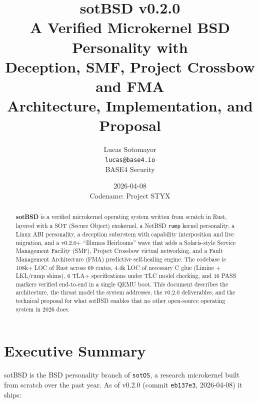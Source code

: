 \documentclass[11pt,a4paper]{article}
\title{
  \vspace{-1.5cm}
  \textbf{sotBSD v0.2.0} \\[0.4em]
  \large A Verified Microkernel BSD Personality with \\
  Deception, SMF, Project Crossbow and FMA \\[0.6em]
  \normalsize Architecture, Implementation, and Proposal
}
\author{
  Lucas Sotomayor \\
  \texttt{lucas@base4.io} \\
  BASE4 Security
}
\date{2026-04-08 \\ Codename: Project STYX}
\begin{document}

\maketitle
\thispagestyle{empty}

\begin{abstract}
\noindent
\textbf{sotBSD} is a verified microkernel operating system written from
scratch in Rust, layered with a SOT (Secure Object) exokernel, a NetBSD
\texttt{rump} kernel personality, a Linux ABI personality, a deception
subsystem with capability interposition and live migration, and a v0.2.0+
``Illumos Heirlooms'' wave that adds a Solaris-style Service Management
Facility (SMF), Project Crossbow virtual networking, and a Fault
Management Architecture (FMA) predictive self-healing engine. The
codebase is 108k+ LOC of Rust across 69 crates, 4.4k LOC of necessary
C glue (Limine + LKL/rump shims), 6 TLA+ specifications under TLC model
checking, and 16 PASS markers verified end-to-end in a single QEMU boot.
This document describes the architecture, the threat model the system
addresses, the v0.2.0 deliverables, and the technical proposal for what
sotBSD enables that no other open-source operating system in 2026 does.
\end{abstract}

\tableofcontents
\newpage

\section{Executive Summary}

sotBSD is the BSD personality branch of \texttt{sotOS}, a research
microkernel built from scratch over the past year. As of v0.2.0
(commit \texttt{eb137e3}, 2026-04-08) it ships:
\end{document}
